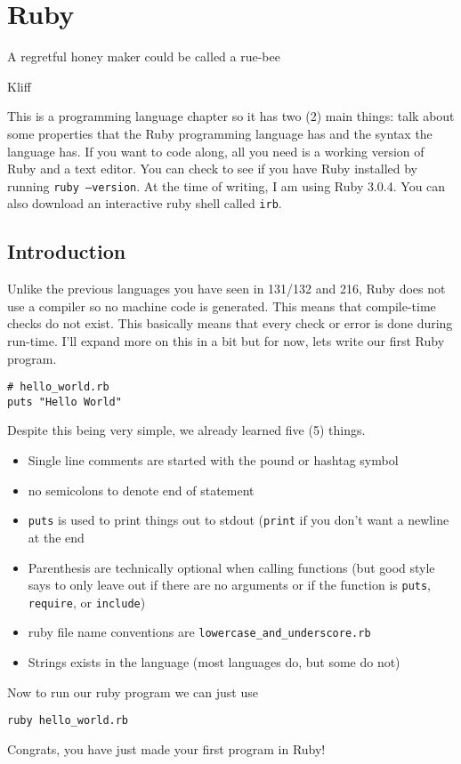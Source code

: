 \documentclass[main.tex]{subfiles}
\begin{document}
\chapter{Ruby}
\epigraph{A regretful honey maker could be called a rue-bee}{Kliff}

This is a programming language chapter so it has two (2) main things: talk about some properties that the Ruby programming language has and the syntax the language has. If you want to code along, all you need is a working version of Ruby and a text editor. You can check to see if you have Ruby installed by running \texttt{ruby --version}. At the time of writing, I am using Ruby 3.0.4. 
You can also download an interactive ruby shell called \texttt{irb}. 

\section{Introduction}

Unlike the previous languages you have seen in 131/132 and 216, Ruby does not use a compiler so no machine code is generated. This means that compile-time checks do not exist. This basically means that every check or error is done during run-time. I'll expand more on this in a bit but for now, lets write our first Ruby program. 

\begin{lstlisting}[style=MyRubyStyle]
# hello_world.rb
puts "Hello World"
\end{lstlisting}
Despite this being very simple, we already learned five (5) things.
\begin{itemize}
    \item Single line comments are started with the pound or hashtag symbol
    \item no semicolons to denote end of statement
    \item \texttt{puts} is used to print things out to stdout (\texttt{print} if you don't want a newline at the end
    \item Parenthesis are technically optional when calling functions (but good style says to only leave out if there are no arguments or if the function is \texttt{puts}, \texttt{require}, or \texttt{include})
    \item ruby file name conventions are \texttt{lowercase\_and\_underscore.rb}
    \item Strings exists in the language (most languages do, but some do not)
\end{itemize}
Now to run our ruby program we can just use
\begin{lstlisting}[style=MyRubyStyle]
ruby hello_world.rb
\end{lstlisting}
Congrats, you have just made your first program in Ruby!
\end{document}
